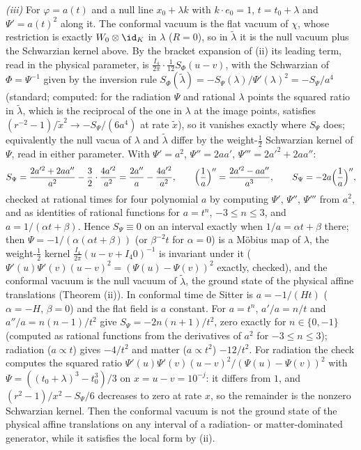 \emph{(iii)} For $\varphi = a(t)$ and a null line $x_{0} + \lambda k$ with $k\cdot e_{0} = 1$, $t = t_{0} + \lambda$ and $\Psi' = a(t)^{2}$ along it. The conformal vacuum is the flat vacuum of $\chi$, whose restriction is exactly $W_{0}\otimes\id_{K}$ in $\lambda$ ($R = 0$), so in $\tilde\lambda$ it is the null vacuum plus the Schwarzian kernel above. By the bracket expansion of (ii) its leading term, read in the physical parameter, is $\tfrac{I_{4}}{2\pi}\cdot\tfrac{1}{12}S_{\Phi}(u - v)$, with the Schwarzian of $\Phi = \Psi^{-1}$ given by the inversion rule $S_{\Phi}(\tilde\lambda) = -S_{\Psi}(\lambda)/\Psi'(\lambda)^{2} = -S_{\Psi}/a^{4}$ (standard; computed: for the radiation $\Psi$ and rational $\lambda$ points the squared ratio in $\tilde\lambda$, which is the reciprocal of the one in $\lambda$ at the image points, satisfies $(r^{-2} - 1)/\tilde x^{2} \to -S_{\Psi}/(6a^{4})$ at rate $\tilde x$), so it vanishes exactly where $S_{\Psi}$ does; equivalently the null vacua of $\lambda$ and $\tilde\lambda$ differ by the weight-$\tfrac12$ Schwarzian kernel of $\Psi$, read in either parameter. With $\Psi' = a^{2}$, $\Psi'' = 2aa'$, $\Psi''' = 2a'^{2} + 2aa''$:
\[
S_{\Psi} = \frac{2a'^{2} + 2aa''}{a^{2}} - \frac32\cdot\frac{4a'^{2}}{a^{2}} = \frac{2a''}{a} - \frac{4a'^{2}}{a^{2}}, \qquad \Bigl(\frac1a\Bigr)'' = \frac{2a'^{2} - aa''}{a^{3}}, \qquad S_{\Psi} = -2a\Bigl(\frac1a\Bigr)'' ,
\]
checked at rational times for four polynomial $a$ by computing $\Psi'$, $\Psi''$, $\Psi'''$ from $a^{2}$, and as identities of rational functions for $a = t^{n}$, $-3 \le n \le 3$, and $a = 1/(\alpha t + \beta)$. Hence $S_{\Psi} \equiv 0$ on an interval exactly when $1/a = \alpha t + \beta$ there; then $\Psi = -1/(\alpha(\alpha t + \beta))$ (or $\beta^{-2}t$ for $\alpha = 0$) is a M\"obius map of $\lambda$, the weight-$\tfrac12$ kernel $\tfrac{I_{4}}{2\pi}(u - v + I_{4}0)^{-1}$ is invariant under it ($\Psi'(u)\Psi'(v)(u - v)^{2} = (\Psi(u) - \Psi(v))^{2}$ exactly, checked), and the conformal vacuum is the null vacuum of $\tilde\lambda$, the ground state of the physical affine translations (Theorem (ii)). In conformal time de Sitter is $a = -1/(Ht)$ ($\alpha = -H$, $\beta = 0$) and the flat field is $a$ constant. For $a = t^{n}$, $a'/a = n/t$ and $a''/a = n(n - 1)/t^{2}$ give $S_{\Psi} = -2n(n + 1)/t^{2}$, zero exactly for $n \in \{0, -1\}$ (computed as rational functions from the derivatives of $a^{2}$ for $-3 \le n \le 3$); radiation ($a \propto t$) gives $-4/t^{2}$ and matter ($a \propto t^{2}$) $-12/t^{2}$. For radiation the check computes the squared ratio $\Psi'(u)\Psi'(v)(u - v)^{2}/(\Psi(u) - \Psi(v))^{2}$ with $\Psi = ((t_{0} + \lambda)^{3} - t_{0}^{3})/3$ on $x = u - v = 10^{-j}$: it differs from $1$, and $(r^{2} - 1)/x^{2} - S_{\Psi}/6$ decreases to zero at rate $x$, so the remainder is the nonzero Schwarzian kernel. Then the conformal vacuum is not the ground state of the physical affine translations on any interval of a radiation- or matter-dominated generator, while it satisfies the local form by (ii).
